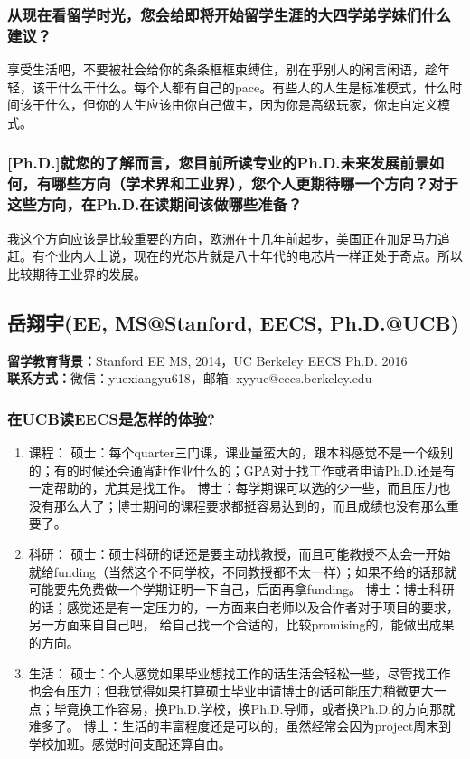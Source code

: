\documentclass[a4paper,UTF8]{book}
\begin{document}
    \subsubsection*{从现在看留学时光，您会给即将开始留学生涯的大四学弟学妹们什么建议？}
    享受生活吧，不要被社会给你的条条框框束缚住，别在乎别人的闲言闲语，趁年轻，该干什么干什么。每个人都有自己的pace。有些人的人生是标准模式，什么时间该干什么，但你的人生应该由你自己做主，因为你是高级玩家，你走自定义模式。
    
    \subsubsection*{[Ph.D.]就您的了解而言，您目前所读专业的Ph.D.未来发展前景如何，有哪些方向（学术界和工业界），您个人更期待哪一个方向？对于这些方向，在Ph.D.在读期间该做哪些准备？}
    我这个方向应该是比较重要的方向，欧洲在十几年前起步，美国正在加足马力追赶。有个业内人士说，现在的光芯片就是八十年代的电芯片一样正处于奇点。所以比较期待工业界的发展。


\clearpage
\subsection{岳翔宇(EE, MS@Stanford, EECS, Ph.D.@UCB)}
    \textbf{留学教育背景：}Stanford EE MS, 2014，UC Berkeley EECS Ph.D. 2016\\
    \textbf{联系方式：}微信：yuexiangyu618，邮箱: xyyue@eecs.berkeley.edu

    \subsubsection*{在UCB读EECS是怎样的体验?}
        \begin{enumerate}[itemindent=0pt,itemsep=0pt,parsep=0pt]
            \item 课程：
            硕士：每个quarter三门课，课业量蛮大的，跟本科感觉不是一个级别的；有的时候还会通宵赶作业什么的；GPA对于找工作或者申请Ph.D.还是有一定帮助的，尤其是找工作。
            博士：每学期课可以选的少一些，而且压力也没有那么大了；博士期间的课程要求都挺容易达到的，而且成绩也没有那么重要了。
            \item 科研：
                硕士：硕士科研的话还是要主动找教授，而且可能教授不太会一开始就给funding（当然这个不同学校，不同教授都不太一样）；如果不给的话那就可能要先免费做一个学期证明一下自己，后面再拿funding。
                博士：博士科研的话；感觉还是有一定压力的，一方面来自老师以及合作者对于项目的要求，另一方面来自自己吧， 给自己找一个合适的，比较promising的，能做出成果的方向。
            \item 生活：
                硕士：个人感觉如果毕业想找工作的话生活会轻松一些，尽管找工作也会有压力；但我觉得如果打算硕士毕业申请博士的话可能压力稍微更大一点；毕竟换工作容易，换Ph.D.学校，换Ph.D.导师，或者换Ph.D.的方向那就难多了。
                博士：生活的丰富程度还是可以的，虽然经常会因为project周末到学校加班。感觉时间支配还算自由。
        \end{enumerate}
\end{document}
